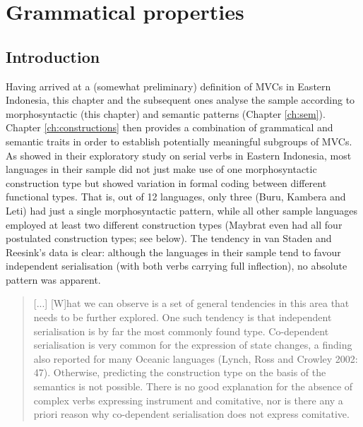 \chapter{Grammatical properties}\label{ch:gram}
\section{Introduction}

Having arrived at a (somewhat preliminary) definition of MVCs in Eastern Indonesia, this chapter and the subsequent ones analyse the sample according to morphosyntactic (this chapter) and semantic patterns (Chapter \ref{ch:sem}). Chapter \ref{ch:constructions} then provides a combination of grammatical and semantic traits in order to establish potentially meaningful subgroups of MVCs. As \citet{vanstaden2008serial} showed in their exploratory study on serial verbs in Eastern Indonesia, most languages in their sample did not just make use of one morphosyntactic construction type but showed variation in formal coding between different functional types. That is, out of 12 languages, only three (Buru, Kambera and Leti) had just a single morphosyntactic pattern, while all other sample languages employed at least two different construction types (Maybrat even had all four postulated construction types; see  below). The tendency in van Staden and Reesink's data is clear: although the languages in their sample tend to favour independent serialisation (with both verbs carrying full inflection), no absolute pattern was apparent.

\begin{quote}
[...] [W]hat we can observe is a set of general tendencies in this area that needs to be further explored. One such tendency is that independent serialisation is by far the most commonly found type. Co-dependent serialisation is very common for the expression of state changes, a finding also reported for many Oceanic languages (Lynch, Ross and Crowley 2002: 47). Otherwise, predicting the construction type on the basis of the semantics is not possible. There is no good explanation for the absence of complex verbs expressing instrument and comitative, nor is there any a priori reason why co-dependent serialisation does not express comitative. \citep[48]{vanstaden2008serial}\end{quote}

